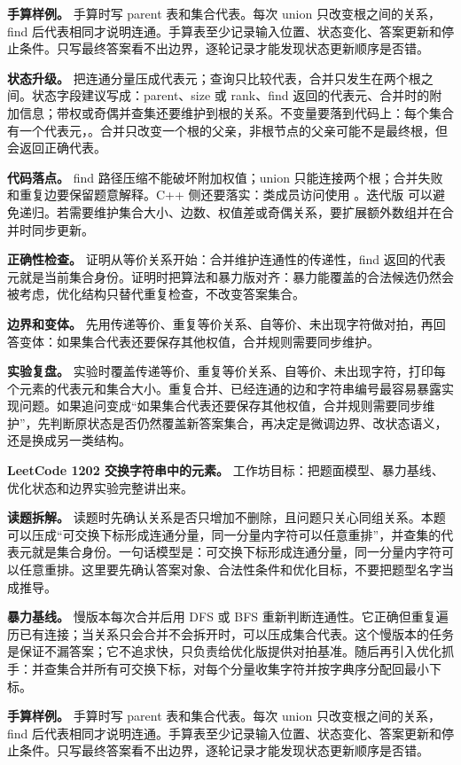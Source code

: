 \textbf{手算样例。} 手算时写 parent 表和集合代表。每次 union 只改变根之间的关系，find 后代表相同才说明连通。手算表至少记录输入位置、状态变化、答案更新和停止条件。只写最终答案看不出边界，逐轮记录才能发现状态更新顺序是否错。

\textbf{状态升级。} 把连通分量压成代表元；查询只比较代表，合并只发生在两个根之间。状态字段建议写成：parent、size 或 rank、find 返回的代表元、合并时的附加信息；带权或奇偶并查集还要维护到根的关系。不变量要落到代码上：每个集合有一个代表元，。合并只改变一个根的父亲，非根节点的父亲可能不是最终根，但  会返回正确代表。

\textbf{代码落点。} find 路径压缩不能破坏附加权值；union 只能连接两个根；合并失败和重复边要保留题意解释。C++ 侧还要落实：类成员访问使用 。迭代版  可以避免递归。若需要维护集合大小、边数、权值差或奇偶关系，要扩展额外数组并在合并时同步更新。

\textbf{正确性检查。} 证明从等价关系开始：合并维护连通性的传递性，find 返回的代表元就是当前集合身份。证明时把算法和暴力版对齐：暴力能覆盖的合法候选仍然会被考虑，优化结构只替代重复检查，不改变答案集合。

\textbf{边界和变体。} 先用传递等价、重复等价关系、自等价、未出现字符做对拍，再回答变体：如果集合代表还要保存其他权值，合并规则需要同步维护。

\textbf{实验复盘。} 实验时覆盖传递等价、重复等价关系、自等价、未出现字符，打印每个元素的代表元和集合大小。重复合并、已经连通的边和字符串编号最容易暴露实现问题。如果追问变成“如果集合代表还要保存其他权值，合并规则需要同步维护”，先判断原状态是否仍然覆盖新答案集合，再决定是微调边界、改状态语义，还是换成另一类结构。

\noindent\textbf{LeetCode 1202 交换字符串中的元素。} 工作坊目标：把题面模型、暴力基线、优化状态和边界实验完整讲出来。

\textbf{读题拆解。} 读题时先确认关系是否只增加不删除，且问题只关心同组关系。本题可以压成“可交换下标形成连通分量，同一分量内字符可以任意重排”，并查集的代表元就是集合身份。一句话模型是：可交换下标形成连通分量，同一分量内字符可以任意重排。这里要先确认答案对象、合法性条件和优化目标，不要把题型名字当成推导。

\textbf{暴力基线。} 慢版本每次合并后用 DFS 或 BFS 重新判断连通性。它正确但重复遍历已有连接；当关系只会合并不会拆开时，可以压成集合代表。这个慢版本的任务是保证不漏答案；它不追求快，只负责给优化版提供对拍基准。随后再引入优化抓手：并查集合并所有可交换下标，对每个分量收集字符并按字典序分配回最小下标。

\textbf{手算样例。} 手算时写 parent 表和集合代表。每次 union 只改变根之间的关系，find 后代表相同才说明连通。手算表至少记录输入位置、状态变化、答案更新和停止条件。只写最终答案看不出边界，逐轮记录才能发现状态更新顺序是否错。

